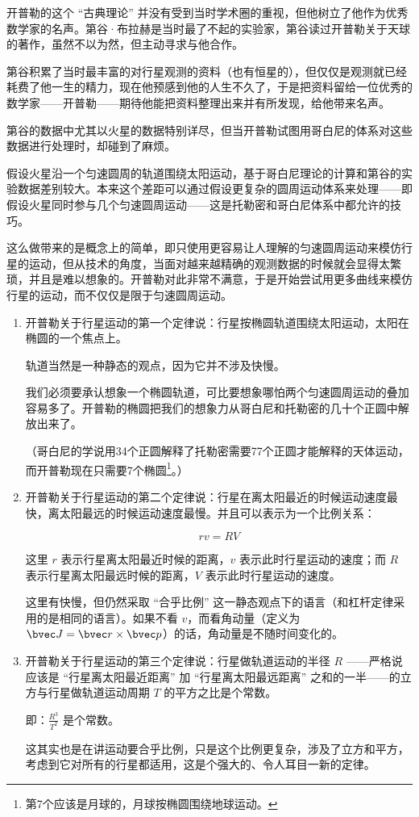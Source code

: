 开普勒的这个 “古典理论” 并没有受到当时学术圈的重视，但他树立了他作为优秀数学家的名声。第谷·布拉赫是当时最了不起的实验家，第谷读过开普勒关于天球的著作，虽然不以为然，但主动寻求与他合作。

第谷积累了当时最丰富的对行星观测的资料（也有恒星的），但仅仅是观测就已经耗费了他一生的精力，现在他预感到他的人生不久了，于是把资料留给一位优秀的数学家——开普勒——期待他能把资料整理出来并有所发现，给他带来名声。

第谷的数据中尤其以火星的数据特别详尽，但当开普勒试图用哥白尼的体系对这些数据进行处理时，却碰到了麻烦。

假设火星沿一个匀速圆周的轨道围绕太阳运动，基于哥白尼理论的计算和第谷的实验数据差别较大。本来这个差距可以通过假设更复杂的圆周运动体系来处理——即假设火星同时参与几个匀速圆周运动——这是托勒密和哥白尼体系中都允许的技巧。

这么做带来的是概念上的简单，即只使用更容易让人理解的匀速圆周运动来模仿行星的运动，但从技术的角度，当面对越来越精确的观测数据的时候就会显得太繁琐，并且是难以想象的。开普勒对此非常不满意，于是开始尝试用更多曲线来模仿行星的运动，而不仅仅是限于匀速圆周运动。

\begin{enumerate}
\item 

开普勒关于行星运动的第一个定律说：行星按椭圆轨道围绕太阳运动，太阳在椭圆的一个焦点上。

轨道当然是一种静态的观点，因为它并不涉及快慢。

我们必须要承认想象一个椭圆轨道，可比要想象哪怕两个匀速圆周运动的叠加容易多了。开普勒的椭圆把我们的想象力从哥白尼和托勒密的几十个正圆中解放出来了。

（哥白尼的学说用34个正圆解释了托勒密需要77个正圆才能解释的天体运动，而开普勒现在只需要7个椭圆\footnote{第7个应该是月球的，月球按椭圆围绕地球运动。}。）

\item

开普勒关于行星运动的第二个定律说：行星在离太阳最近的时候运动速度最快，离太阳最远的时候运动速度最慢。并且可以表示为一个比例关系：

\begin{equation}
r v = R V
\end{equation}

这里 $r$ 表示行星离太阳最近时候的距离，$v$ 表示此时行星运动的速度；而 $R$ 表示行星离太阳最远时候的距离，$V$ 表示此时行星运动的速度。

这里有快慢，但仍然采取 “合乎比例” 这一静态观点下的语言（和杠杆定律采用的是相同的语言）。如果不看 $v$，而看角动量（定义为 $\bvec J = \bvec r \times \bvec p$）的话，角动量是不随时间变化的。

\item

开普勒关于行星运动的第三个定律说：行星做轨道运动的半径 $R$ ——严格说应该是 “行星离太阳最近距离” 加 “行星离太阳最远距离” 之和的一半——的立方与行星做轨道运动周期 $T$ 的平方之比是个常数。

即：$\frac{R^3}{T^2} $ 是个常数。

这其实也是在讲运动要合乎比例，只是这个比例更复杂，涉及了立方和平方，考虑到它对所有的行星都适用，这是个强大的、令人耳目一新的定律。

\end{enumerate}


